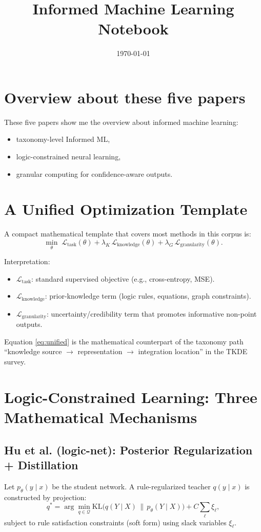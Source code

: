 ﻿\documentclass[11pt,a4paper]{article}
\title{Informed Machine Learning Notebook}
\author{}
\date{\today}
\begin{document}
\maketitle

\section{Overview about these five papers}
These five papers show me the overview about informed machine learning:
\begin{itemize}
\item taxonomy-level Informed ML,
\item logic-constrained neural learning,
\item granular computing for confidence-aware outputs.
\end{itemize}

\section{A Unified Optimization Template}
A compact mathematical template that covers most methods in this corpus is:
\begin{equation}
\min_{\theta} \; \mathcal{L}_{\text{task}}(\theta)
+ \lambda_{K}\,\mathcal{L}_{\text{knowledge}}(\theta)
+ \lambda_{G}\,\mathcal{L}_{\text{granularity}}(\theta).
\label{eq:unified}
\end{equation}

Interpretation:
\begin{itemize}
\item $\mathcal{L}_{\text{task}}$: standard supervised objective (e.g., cross-entropy, MSE).
\item $\mathcal{L}_{\text{knowledge}}$: prior-knowledge term (logic rules, equations, graph constraints).
\item $\mathcal{L}_{\text{granularity}}$: uncertainty/credibility term that promotes informative non-point outputs.
\end{itemize}
Equation \eqref{eq:unified} is the mathematical counterpart of the taxonomy path ``knowledge source $\rightarrow$ representation $\rightarrow$ integration location'' in the TKDE survey.

\section{Logic-Constrained Learning: Three Mathematical Mechanisms}

\subsection{Hu et al. (logic-net): Posterior Regularization + Distillation}
Let $p_{\theta}(y\mid x)$ be the student network. A rule-regularized teacher $q(y\mid x)$ is constructed by projection:
\begin{equation}
q^{\ast} = \arg\min_{q \in \mathcal{Q}} \mathrm{KL}\big(q(Y\mid X)\,\|\,p_{\theta}(Y\mid X)\big) 
+ C \sum_{\ell} \xi_{\ell},
\label{eq:pr_projection}
\end{equation}
subject to rule satisfaction constraints (soft form) using slack variables $\xi_{\ell}$.
\end{document}
